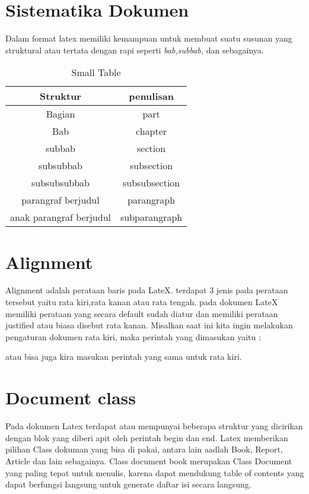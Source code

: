 \section{Sistematika Dokumen}
Dalam format latex memiliki kemampuan untuk membuat suatu susunan yang struktural atau tertata dengan rapi
seperti \textit{bab,subbab,} dan sebagainya.

\begin{table}[h]
\caption{Small Table}
\centering

\begin{tabular}{|c|c|}
\hline
\textbf{Struktur}&\textbf{penulisan}\\
\hline
Bagian&{part}\\
\hline
Bab&{chapter}\\
\hline
subbab&{section}\\
\hline
subsubbab&subsection\\
\hline
subsubsubbab&subsubsection\\
\hline
parangraf berjudul&{parangraph}\\
\hline
anak parangraf berjudul &{subparangraph}\\
\hline
\end{tabular}

\label{table:contoh}
\end{table}
 
\section{Alignment}
Alignment adalah perataan baris pada LateX. terdapat 3 jenis pada perataan tersebut yaitu rata kiri,rata kanan atau rata tengah. pada dokumen LateX memiliki perataan yang secara default sudah diatur dan memiliki perataan justified atau biasa disebut rata kanan.
Misalkan saat ini kita ingin melakukan pengaturan dokumen rata kiri, maka perintah yang dimasukan yaitu :

atau bisa juga kira masukan perintah yang sama untuk rata kiri.


\section{Document class}

Pada dokumen Latex terdapat atau mempunyai beberapa struktur yang dicirikan dengan blok yang diberi apit oleh perintah begin dan end. Latex memberikan pilihan Class dokuman yang bisa di pakai, antara lain aadlah Book, Report, Article dan lain sebagainya. Class document book merupakan Class Document yang paling tepat untuk menulis, karena dapat mendukung table of contents yang dapat berfungsi langsung untuk generate daftar isi secara langsung.

